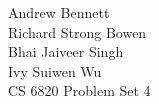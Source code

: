 \documentclass{article}
\begin{document}
\begin{flushright}
Andrew Bennett\\
Richard Strong Bowen\\
Bhai Jaiveer Singh\\
Ivy Suiwen Wu\\
CS 6820 Problem Set 4
\end{flushright}





\end{document}
